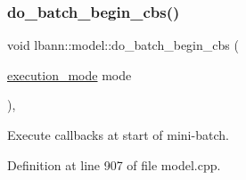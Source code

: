 \subsubsection{\texorpdfstring{do\+\_\+batch\+\_\+begin\+\_\+cbs()}{do\_batch\_begin\_cbs()}}
{\footnotesize\ttfamily void lbann\+::model\+::do\+\_\+batch\+\_\+begin\+\_\+cbs (\begin{DoxyParamCaption}\item[{\hyperlink{base_8hpp_a2781a159088df64ed7d47cc91c4dc0a8}{execution\+\_\+mode}}]{mode }\end{DoxyParamCaption})\hspace{0.3cm}{\ttfamily [protected]}, {\ttfamily [virtual]}}

Execute callbacks at start of mini-\/batch. 

Definition at line 907 of file model.\+cpp.


